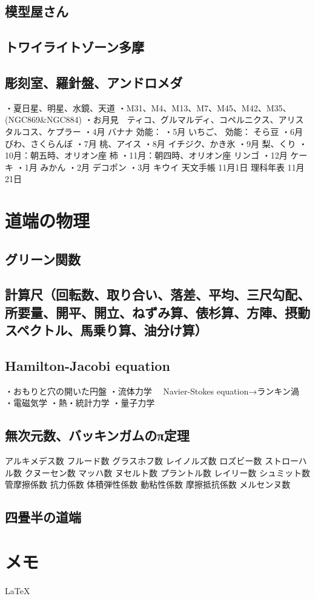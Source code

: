 \documentclass[12pt,a4paper]{jbook}
\begin{document}
\section{模型屋さん}
\section{トワイライトゾーン多摩}
\section{彫刻室、羅針盤、アンドロメダ}
・夏日星、明星、水鏡、天道
・M31、M4、M13、M7、M45、M42、M35、(NGC869\&NGC884)
・お月見　ティコ、グルマルディ、コペルニクス、アリスタルコス、ケプラー
・4月
バナナ
効能：
・5月
いちご、
効能：
そら豆
・6月
びわ、さくらんぼ
・7月
桃、アイス
・8月
イチジク、かき氷
・9月
梨、くり
・10月：朝五時、オリオン座
柿
・11月：朝四時、オリオン座
リンゴ
・12月
ケーキ
・1月
みかん
・2月
デコポン
・3月
キウイ
天文手帳 11月1日
理科年表 11月21日
\chapter{道端の物理}
\section{グリーン関数}
\section{計算尺（回転数、取り合い、落差、平均、三尺勾配、所要量、開平、開立、ねずみ算、俵杉算、方陣、摂動スペクトル、馬乗り算、油分け算）}
\section{Hamilton-Jacobi equation}
・おもりと穴の開いた円盤
・流体力学
　Navier-Stokes equation→ランキン渦
・電磁気学
・熱・統計力学
・量子力学
\section{無次元数、バッキンガムのπ定理}
アルキメデス数
フルード数
グラスホフ数
レイノルズ数
ロズビー数
ストローハル数
クヌーセン数
マッハ数
ヌセルト数
プラントル数
レイリー数
シュミット数
管摩擦係数
抗力係数
体積弾性係数
動粘性係数
摩擦抵抗係数
メルセンヌ数
\section{四畳半の道端}
\chapter{メモ}

\begin{flushright}
\LaTeX \\
\end{flushright}
\end{document}
